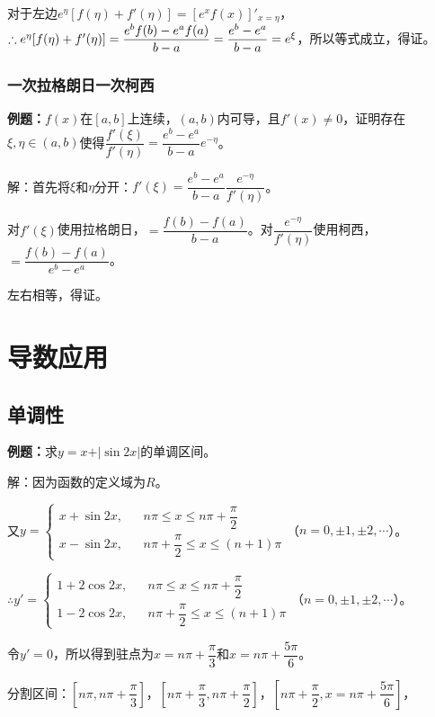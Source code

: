 \documentclass[UTF8, 12pt]{ctexart}
\begin{document}
对于左边$e^\eta[f(\eta)+f'(\eta)]=[e^xf(x)]'_{x=\eta}$，$\therefore e^\eta[f(\eta)+f'(\eta)]=\dfrac{e^bf(b)-e^af(a)}{b-a}\\=\dfrac{e^b-e^a}{b-a}=e^\xi$，所以等式成立，得证。

\subsubsection{一次拉格朗日一次柯西}

\textbf{例题：}$f(x)$在$[a,b]$上连续，$(a,b)$内可导，且$f'(x)\neq0$，证明存在$\xi,\eta\in(a,b)$使得$\dfrac{f'(\xi)}{f'(\eta)}=\dfrac{e^b-e^a}{b-a}e^{-\eta}$。

解：首先将$\xi$和$\eta$分开：$f'(\xi)=\dfrac{e^b-e^a}{b-a}\dfrac{e^{-\eta}}{f'(\eta)}$。

对$f'(\xi)$使用拉格朗日，$=\dfrac{f(b)-f(a)}{b-a}$。对$\dfrac{e^{-\eta}}{f'(\eta)}$使用柯西，$=\dfrac{f(b)-f(a)}{e^b-e^a}$。

左右相等，得证。

\section{导数应用}

\subsection{单调性}

\textbf{例题：}求$y=x+\vert\sin 2x\vert$的单调区间。

解：因为函数的定义域为$R$。

又$y=\left\{\begin{array}{lcl}
    x+\sin 2x, & & n\pi\leqslant x\leqslant n\pi+\dfrac{\pi}{2} \\
    x-\sin 2x, & &n\pi+\dfrac{\pi}{2}\leqslant x\leqslant (n+1)\pi
\end{array}\right.$（$n=0,\pm 1,\pm2,\cdots$）。

$\therefore y'=\left\{\begin{array}{lcl}
    1+2\cos 2x, & & n\pi\leqslant x\leqslant n\pi+\dfrac{\pi}{2} \\
    1-2\cos 2x, & &n\pi+\dfrac{\pi}{2}\leqslant x\leqslant (n+1)\pi
\end{array}\right.$（$n=0,\pm 1,\pm2,\cdots$）。

令$y'=0$，所以得到驻点为$x=n\pi+\dfrac{\pi}{3}$和$x=n\pi+\dfrac{5\pi}{6}$。

分割区间：$\left[n\pi,n\pi+\dfrac{\pi}{3}\right]$，$\left[n\pi+\dfrac{\pi}{3},n\pi+\dfrac{\pi}{2}\right]$，$\left[n\pi+\dfrac{\pi}{2},x=n\pi+\dfrac{5\pi}{6}\right]$，
\end{document}
